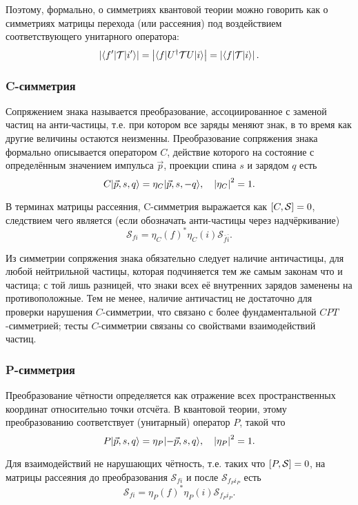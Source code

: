 \documentclass[14pt]{extarticle}
\newcommand{\SMatrix}{\mathcal{S}}
\newcommand{\TMatrix}{\mathcal{T}}
\begin{document}
Поэтому, формально, о симметриях квантовой теории можно говорить как о симметриях матрицы перехода (или рассеяния) под воздействием соответствующего унитарного оператора:
\[
\Mod{\bra{f'}\TMatrix\ket{i'}} = \Mod{\bra{f}U^\dagger\TMatrix U\ket{i}} = \Mod{\bra{f}\TMatrix\ket{i}}.
\]


\subsubsection{C-симметрия}

Сопряжением знака называется преобразование, ассоциированное с заменой частиц на анти-частицы, т.е. при котором все заряды меняют знак, в то время как другие величины остаются неизменны. Преобразование сопряжения знака формально описывается оператором $C$, действие которого на состояние с определённым значением импульса $\vec{p}$, проекции спина $s$ и зарядом $q$ есть
\[
C\vert{\vec{p}, s, q}\rangle = \eta_C\vert{\vec{p}, s, -q}\rangle, \quad \left\vert{\eta_C}\right\vert^2 = 1.
\]

В терминах матрицы рассеяния, C-симметрия выражается как $\sqB{C,\SMatrix}=0$, следствием чего является (если обозначать анти-частицы через надчёркивание) 
\[
\SMatrix_{fi} = \eta_C(f)^*\eta_C(i)\SMatrix_{\bar{f}\bar{i}}.
\]

Из симметрии сопряжения знака обязательно следует наличие античастицы, для любой нейтрильной частицы, которая подчиняется тем же самым законам что и частица; с той лишь разницей, что знаки всех её внутренних зарядов заменены на противоположные. Тем не менее, наличие античастиц не достаточно для проверки нарушения $C$-симметрии, что связано с более фундаментальной $CPT$-симметрией; тесты $C$-симметрии связаны со свойствами взаимодействий частиц.~\cite[стр. 98]{Symmetries}

\subsubsection{P-симметрия}

Преобразование чётности определяется как отражение всех пространственных координат относительно точки отсчёта. В квантовой теории, этому преобразованию соответствует (унитарный) оператор $P$, такой что
\[
P\vert{\vec{p}, s, q}\rangle = \eta_P\vert{-\vec{p}, s, q}\rangle, \quad \left\vert{\eta_P}\right\vert^2 = 1.
\]

Для взаимодействий не нарушающих чётность, т.е. таких что $\sqB{P, \SMatrix} = 0$, на матрицы рассеяния до преобразования $\SMatrix_{fi}$ и после $\SMatrix_{f_P i_P}$ есть
\[
\SMatrix_{fi} = \eta_P(f)^*\eta_P(i)\SMatrix_{f_P i_P}.
\]
\end{document}
